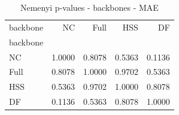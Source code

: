 \begin{table}
\caption{Nemenyi p-values - backbones - MAE}
\label{tab:nemenyi_backbones_mae}
\begin{tabular}{lrrrr}
\toprule
backbone & NC & Full & HSS & DF \\
backbone &  &  &  &  \\
\midrule
NC & 1.0000 & 0.8078 & 0.5363 & 0.1136 \\
Full & 0.8078 & 1.0000 & 0.9702 & 0.5363 \\
HSS & 0.5363 & 0.9702 & 1.0000 & 0.8078 \\
DF & 0.1136 & 0.5363 & 0.8078 & 1.0000 \\
\bottomrule
\end{tabular}
\end{table}
